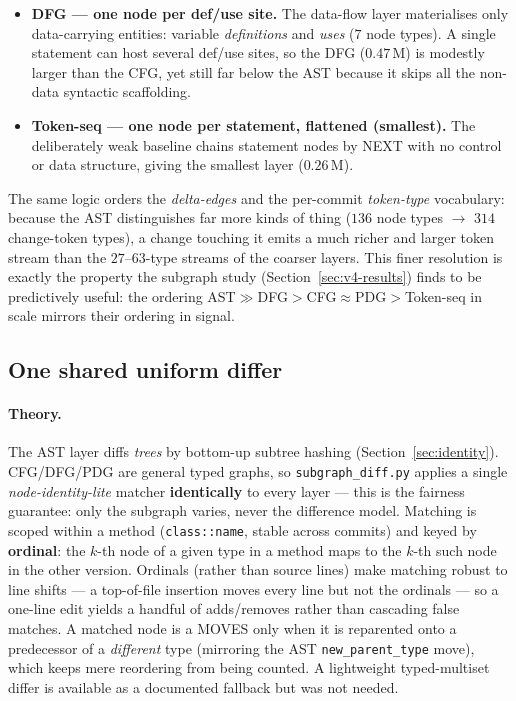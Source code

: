 \documentclass[11pt,a4paper]{article}
\newcommand{\code}[1]{\texttt{#1}}
\newcommand{\edge}[1]{\textsc{#1}}
\begin{document}
\begin{itemize}[nosep,leftmargin=1.4em]
		granularity and do \emph{not} embed the AST subtree under each statement. A
		canonical CPG that did so would, by construction, contain the AST as a
		subgraph and therefore exceed the AST layer in size; we do not build it, as
		the goal here is to isolate each representation, not to superset them.)
		\item \textbf{DFG --- one node per def/use site.} The data-flow layer
		materialises only data-carrying entities: variable \emph{definitions} and
		\emph{uses} ($7$ node types). A single statement can host several def/use
		sites, so the DFG ($0.47$\,M) is modestly larger than the CFG, yet still far
		below the AST because it skips all the non-data syntactic scaffolding.
		\item \textbf{Token-seq --- one node per statement, flattened (smallest).}
		The deliberately weak baseline chains statement nodes by \edge{NEXT} with no
		control or data structure, giving the smallest layer ($0.26$\,M).
	\end{itemize}
	The same logic orders the \emph{delta-edges} and the per-commit
	\emph{token-type} vocabulary: because the AST distinguishes far more kinds of
	thing ($136$ node types $\rightarrow$ $314$ change-token types), a change
	touching it emits a much richer and larger token stream than the $27$--$63$-type
	streams of the coarser layers. This finer resolution is exactly the property the
	subgraph study (Section~\ref{sec:v4-results}) finds to be predictively useful:
	the ordering AST\;$\gg$\;DFG\;$>$\;CFG\;$\approx$\;PDG\;$>$\;Token-seq in scale
	mirrors their ordering in signal.

	\subsection{One shared uniform differ}\label{sec:v4-diff}
	\paragraph{Theory.} The AST layer diffs \emph{trees} by bottom-up subtree
	hashing (Section~\ref{sec:identity}). CFG/DFG/PDG are general typed graphs, so
	\code{subgraph\_diff.py} applies a single \emph{node-identity-lite} matcher
	\textbf{identically} to every layer --- this is the fairness guarantee: only the
	subgraph varies, never the difference model. Matching is scoped within a method
	(\code{class::name}, stable across commits) and keyed by \textbf{ordinal}: the
	$k$-th node of a given type in a method maps to the $k$-th such node in the other
	version. Ordinals (rather than source lines) make matching robust to line shifts
	--- a top-of-file insertion moves every line but not the ordinals --- so a
	one-line edit yields a handful of adds/removes rather than cascading false
	matches. A matched node is a \edge{MOVES} only when it is reparented onto a
	predecessor of a \emph{different} type (mirroring the AST \code{new\_parent\_type}
	move), which keeps mere reordering from being counted. A lightweight
	typed-multiset differ is available as a documented fallback but was not needed.
\end{document}
